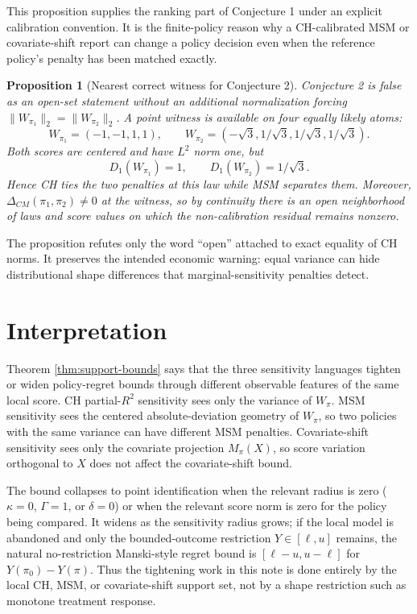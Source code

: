 \documentclass[11pt]{article}
\theoremstyle{definition}
\theoremstyle{plain}
\newtheorem{proposition}{Proposition}
\theoremstyle{remark}
\begin{document}
This proposition supplies the ranking part of Conjecture 1 under an explicit
calibration convention.  It is the finite-policy reason why a CH-calibrated MSM or
covariate-shift report can change a policy decision even when the reference policy's
penalty has been matched exactly.

\begin{proposition}[Nearest correct witness for Conjecture 2]\label{prop:conj2-witness}
Conjecture 2 is false as an open-set statement without an additional normalization
forcing $\|W_{\pi_1}\|_2=\|W_{\pi_2}\|_2$.  A point witness is available on four
equally likely atoms:
\[
  W_{\pi_1}=(-1,-1,1,1),\qquad
  W_{\pi_2}=(-\sqrt 3,1/\sqrt 3,1/\sqrt 3,1/\sqrt 3).
\]
Both scores are centered and have $L^2$ norm one, but
\[
  D_1(W_{\pi_1})=1,\qquad D_1(W_{\pi_2})=1/\sqrt 3.
\]
Hence CH ties the two penalties at this law while MSM separates them.  Moreover,
$\Delta_{CM}(\pi_1,\pi_2)\ne0$ at the witness, so by continuity there is an open
neighborhood of laws and score values on which the non-calibration residual remains
nonzero.
\end{proposition}

The proposition refutes only the word ``open'' attached to exact equality of CH norms.
It preserves the intended economic warning: equal variance can hide distributional
shape differences that marginal-sensitivity penalties detect.

\section{Interpretation}
Theorem \ref{thm:support-bounds} says that the three sensitivity languages tighten or
widen policy-regret bounds through different observable features of the same local
score.  CH partial-$R^2$ sensitivity sees only the variance of $W_\pi$.  MSM sensitivity
sees the centered absolute-deviation geometry of $W_\pi$, so two policies with the
same variance can have different MSM penalties.  Covariate-shift sensitivity sees only
the covariate projection $M_\pi(X)$, so score variation orthogonal to $X$ does not
affect the covariate-shift bound.

The bound collapses to point identification when the relevant radius is zero
($\kappa=0$, $\Gamma=1$, or $\delta=0$) or when the relevant score norm is zero for
the policy being compared.  It widens as the sensitivity radius grows; if the local
model is abandoned and only the bounded-outcome restriction $Y\in[\ell,u]$ remains,
the natural no-restriction Manski-style regret bound is
$[\ell-u,u-\ell]$ for $Y(\pi_0)-Y(\pi)$.  Thus the tightening work in this note is
done entirely by the local CH, MSM, or covariate-shift support set, not by a shape
restriction such as monotone treatment response.
\end{document}
